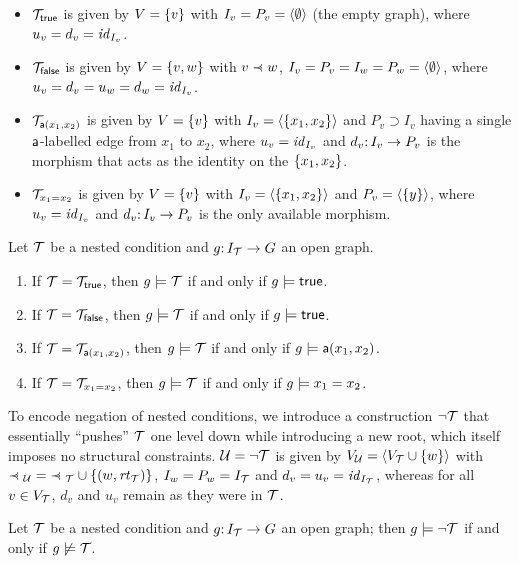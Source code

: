 \begin{itemize}
\item ${\mathcal{T}}_{\mathsf{true}}$ is given by $V=\{{v}\}$ with $I_v=P_v=\langle \emptyset\rangle$ (the empty graph), where $u_v=d_v={\mathit{id}}_{I_v}$.
\item ${\mathcal{T}}_{\mathsf{false}}$ is given by $V=\{{v,w}\}$ with $v\parentof w$, $I_v=P_v=I_w=P_w=\langle \emptyset\rangle$, where $u_v=d_v=u_w=d_w={\mathit{id}}_{I_v}$.
\item ${\mathcal{T}}_{\mathsf{a}(x_1,x_2)}$ is given by $V=\{{v}\}$ with $I_v=\langle \{{x_1,x_2}\}\rangle$ and $P_v\supset I_v$ having a single $\mathsf{a}$-labelled edge from $x_1$ to $x_2$, where $u_v={\mathit{id}}_{I_v}$ and $d_v{:}\, I_v\rightarrow P_v$ is the morphism that acts as the identity on the $\{{x_1,x_2}\}$.
\item ${\mathcal{T}}_{x_1=x_2}$ is given by $V=\{{v}\}$ with $I_v=\langle \{{x_1,x_2}\}\rangle$ and $P_v=\langle \{{y}\}\rangle$, where $u_v={\mathit{id}}_{I_v}$ and $d_v{:}\, I_v\rightarrow P_v$ is the only available morphism.
\end{itemize}

\begin{proposition}
Let ${\mathcal{T}}$ be a nested condition and $g{:}\, I_{\mathcal{T}}\rightarrow G$ an open graph.
\begin{enumerate}
\item If ${\mathcal{T}}={\mathcal{T}}_{\mathsf{true}}$, then $g\models {\mathcal{T}}$ if and only if $g\models\mathsf{true}$.
\item If ${\mathcal{T}}={\mathcal{T}}_{\mathsf{false}}$, then $g\models {\mathcal{T}}$ if and only if $g\models\mathsf{true}$.
\item If ${\mathcal{T}}={\mathcal{T}}_{\mathsf{a}(x_1,x_2)}$, then $g\models {\mathcal{T}}$ if and only if $g\models\mathsf{a}(x_1,x_2)$.
\item If ${\mathcal{T}}={\mathcal{T}}_{x_1=x_2}$, then $g\models {\mathcal{T}}$ if and only if $g\models x_1=x_2$.
\end{enumerate}
\end{proposition}

To encode negation of nested conditions, we introduce a construction $\neg{\mathcal{T}}$ that essentially ``pushes'' ${\mathcal{T}}$ one level down while introducing a new root, which itself imposes no structural constraints. ${\mathcal{U}}=\neg{\mathcal{T}}$ is given by $V_{\mathcal{U}}=\langle V_{\mathcal{T}}\cup\{{w}\}\rangle$ with ${\parentof_\cU}= {\parentof_\cT}\cup \setof{(w,\rt\cT)}$, $I_w=P_w=I_{\mathcal{T}}$ and $d_v=u_v={\mathit{id}}_{I_{\mathcal{T}}}$, whereas for all $v\in V_{\mathcal{T}}$, $d_v$ and $u_v$ remain as they were in ${\mathcal{T}}$.

\begin{proposition}
Let ${\mathcal{T}}$ be a nested condition and $g{:}\, I_{\mathcal{T}}\rightarrow G$ an open graph; then $g\models \neg{\mathcal{T}}$ if and only if $g\not\models{\mathcal{T}}$.
\end{proposition}

